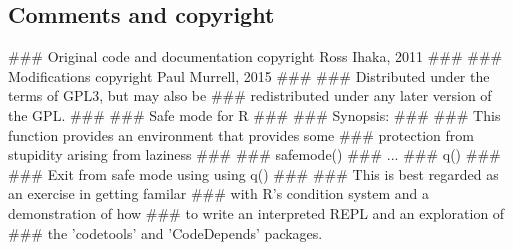 \documentclass[a4paper]{article}%
\begin{document}
\subsection{Comments and copyright}
\label{sec:comments-and-copyright}

\nwenddocs{}\endmoddef\let\nwnotused=\nwoutput{}\nwstartdeflinemarkup{}\nwenddeflinemarkup
###  Original code and documentation copyright Ross Ihaka, 2011
### 
###  Modifications copyright Paul Murrell, 2015
###
###  Distributed under the terms of GPL3, but may also be
###  redistributed under any later version of the GPL.
###
###  Safe mode for R
###
###  Synopsis:
###
###  This function provides an environment that provides some 
###  protection from stupidity arising from laziness
###
###    safemode()
###    ...
###    q()
###
###  Exit from safe mode using using q()
###
###  This is best regarded as an exercise in getting familar
###  with R's condition system and a demonstration of how
###  to write an interpreted REPL and an exploration of 
###  the 'codetools' and 'CodeDepends' packages.

\nwendcode{}
\end{document}
